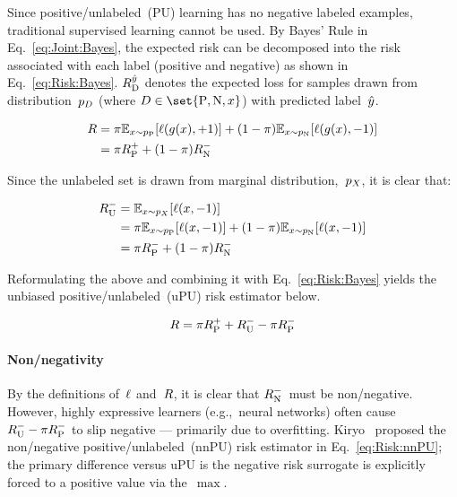 Since positive\-/unlabeled~(PU) learning has no negative labeled examples, traditional supervised learning cannot be used. By Bayes' Rule in Eq.~\eqref{eq:Joint:Bayes}, the expected risk can be decomposed into the risk associated with each label (positive and negative) as shown in Eq.~\eqref{eq:Risk:Bayes}.  ${R_{\textnormal{D}}^{\hat{y}}}$ denotes the expected loss for samples drawn from distribution~${p_{D}}$ (where ${D \in \set{\textnormal{P}, \textnormal{N}, \X}}$) with predicted label~$\hat{y}$.

\begin{align}
  R &= \pi \mathbb{E}_{x \sim p_{\textnormal{P}}}\lbrack\ell\mathopen{}\left(g\mathopen{}\left(x\right)\mathclose{},{+}1\right)\mathclose{}\rbrack + (1-\pi) \mathbb{E}_{x \sim p_{\textnormal{N}}}\lbrack\ell\mathopen{}\left(g\mathopen{}\left(x\right)\mathclose{},{-}1\right)\mathclose{}\rbrack \nonumber \\
        &= \pi R_{\textnormal{P}}^{{+}} + (1-\pi) R_{\textnormal{N}}^{{-}} \label{eq:Risk:Bayes}
\end{align}

Since the unlabeled set is drawn from marginal distribution,~$p_{X}$, it is clear that:

\begin{align}
  R_{\textnormal{U}}^{{-}} &= \mathbb{E}_{x \sim p_{X}} \lbrack\ell\mathopen{}\left(x,{-}1\right)\mathclose{}\rbrack \nonumber \\
            &= \pi \mathbb{E}_{x \sim p_{\textnormal{P}}} \lbrack\ell\mathopen{}\left(x,{-}1\right)\mathclose{}\rbrack + (1 - \pi) \mathbb{E}_{x \sim p_{\textnormal{N}}} \lbrack\ell\mathopen{}\left(x,{-}1\right)\mathclose{}\rbrack\nonumber \\
            &= \pi R_{\textnormal{P}}^{{-}} + (1 - \pi) R_{\textnormal{N}}^{{-}} \label{eq:Risk:Unlabeled}
\end{align}

\noindent
Reformulating the above and combining it with Eq.~\eqref{eq:Risk:Bayes} yields the unbiased positive\-/unlabeled~(uPU) risk estimator below.~\cite{duPlessis:2014}

\begin{equation}\label{eq:Risk:uPU}
  R = \pi R_{\textnormal{P}}^{{+}} + R_{\textnormal{U}}^{{-}} - \pi R_{\textnormal{P}}^{{-}}
\end{equation}

\paragraph{Non\-/negativity} By the definitions of~$\ell$ and~$R$, it is clear that $R_{\textnormal{N}}^{{-}}$~must be non\-/negative.  However, highly expressive learners (e.g.,~neural networks) often cause ${R_{\textnormal{U}}^{{-}} - \pi R_{\textnormal{P}}^{{-}}}$ to slip negative --- primarily due to overfitting.  Kiryo\etal~\cite{Kiryo:2017} proposed the non\-/negative positive\-/unlabeled~(nnPU) risk estimator in Eq.~\eqref{eq:Risk:nnPU}; the primary difference versus uPU is the negative risk surrogate is explicitly forced to a positive value via the~$\max$.

